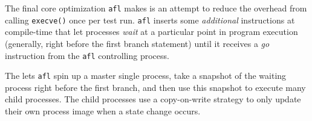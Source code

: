 The final core optimization \texttt{afl} makes is an attempt to reduce the
overhead from calling \texttt{execve()} once per test run. \texttt{afl}
inserts some \textit{additional} instructions at compile-time that let processes
\textit{wait} at a particular point in program execution
(generally, right before the first branch statement) until it receives
a \textit{go} instruction from the \texttt{afl} controlling process.

The lets \texttt{afl} spin up a master single process, take a snapshot of the
waiting process right before the first branch, and then use this snapshot to
execute many child processes. The child processes use a copy-on-write strategy 
to only update their own process image when a state change occurs.

